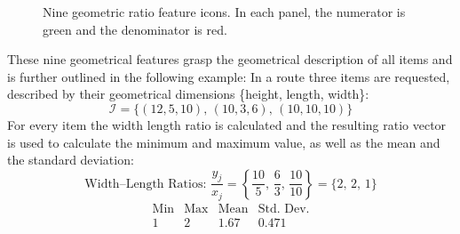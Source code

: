 \begin{figure}[ht]
    \centering

    \vspace{25pt}
    \vspace{25pt}
    \caption[Nine geometric ratio feature icons.]{Nine geometric ratio feature icons. In each panel, the \textcolor{numC}{numerator is green}
        and the \textcolor{denC}{denominator is red}.
        \label{fig:geometrical_ratio_features}}
\end{figure}

These nine geometrical features grasp the geometrical description of all items and is further outlined in the following example:
In a route three items are requested, described by their geometrical dimensions \{height, length, width\}:
\[
    \mathcal{I} = \{(12,5,10),\,(10,3,6),\,(10,10,10)\}
\]
For every item the width length ratio is calculated and the resulting ratio vector is used to calculate the minimum and maximum value,
as well as the mean and the standard deviation:
\[
    \text{Width--Length Ratios: }
    \frac{y_j}{x_j} = \left\{\frac{10}{5},\,\frac{6}{3},\,\frac{10}{10}\right\} = \{2,\,2,\,1\}
\]
\[
    \begin{array}{c|c|c|c}
        \text{Min} & \text{Max} & \text{Mean} & \text{Std. Dev.} \\
        \hline
        1          & 2          & 1.67        & 0.471            \\
    \end{array}
\]

